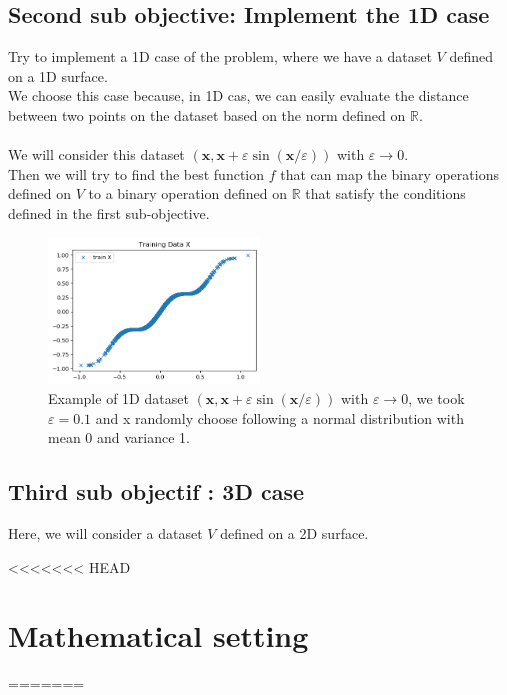 \documentclass{report}
\begin{document}
        \subsection*{Second sub objective: Implement the 1D case}
            Try to implement a 1D case of the problem, where we have a dataset $V$ defined on a 1D surface.
            \\ 
            We choose this case because, in 1D cas, we can easily evaluate the distance between two points on the dataset based on the norm defined on $\mathbb{R}$.
            \\
            \\
            We will consider this dataset 
            $(\mathbf{x}, \mathbf{x}+\varepsilon \sin (\mathbf{x} / \varepsilon))$ with $\varepsilon \rightarrow 0$.
            \\
            Then we will try to find the best function $f$ that can map the binary operations defined on $V$ to a binary operation defined on $\mathbb{R}$ that satisfy the conditions defined in the first sub-objective.
            \newpage
            \begin{figure}
                \centering
                \includegraphics[width=0.5\textwidth]{./images/M.png}
                \caption{Example of 1D dataset  $(\mathbf{x}, \mathbf{x}+\varepsilon \sin (\mathbf{x} / \varepsilon))$ with $\varepsilon \rightarrow 0$, we took $\varepsilon = 0.1$ and x randomly choose following a normal distribution with mean 0 and variance 1.} 
            \end{figure}

        \subsection*{Third sub objectif : 3D case}
            Here, we will consider a dataset $V$ defined on a 2D surface.

        
<<<<<<< HEAD
\section{Mathematical setting}
=======
\end{document}
